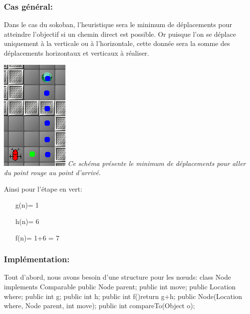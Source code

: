\documentclass{article}
\begin{document}
\subsubsection{Cas général:}
Dans le cas du sokoban, l'heuristique sera le minimum  de déplacements pour atteindre l'objectif si un chemin direct est possible. Or puisque l'on se déplace uniquement à la verticale ou à l'horizontale, cette donnée sera la somme des déplacements horizontaux et verticaux à réaliser.
\begin{center}
\includegraphics[scale=1]{img/heuristic.png} \newline
\textit{Ce schéma présente le minimum de déplacements pour aller du point rouge au point d'arrivé.}
\end{center}
Ainsi pour l'étape en vert:
\begin{itemize}
\item[g(n)= 1]
\item[h(n)= 6]
\item[f(n)= 1+6 = 7]
\end{itemize}
\subsubsection{Implémentation:}
Tout d'abord, nous avons besoin d'une structure pour les nœuds: \newpage
class Node implements Comparable {\newline
public Node parent;\newline
public int move;\newline
public Location where;\newline
public int g;\newline
public int h;\newline
public int f(){return g+h;}\newline
public Node(Location where, Node parent, int move);\newline
public int compareTo(Object o);\newline
}\newline
\end{document}
